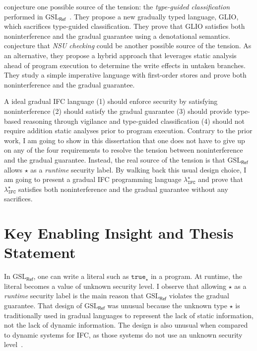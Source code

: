 \documentclass[10pt, letterpaper]{article}
\newcommand{\Surface}{\ensuremath{\lambda_{\mathtt{IFC}}^\star}\xspace}
\newcommand{\GSLRef}{\ensuremath{\mathrm{GSL}_\mathsf{Ref}}\xspace}
\newcommand{\key}[1]{\ensuremath{\mathtt{#1}}}
\newcommand{\unk}{\key{\star}\xspace}
\newcommand{\true}{\key{true}}
\begin{document}
\citet{Amorim:2020aa} conjecture one possible source of the tension: the
\textit{type-guided classification} performed in
\GSLRef~\citep{Toro:2018aa}. They propose a new gradually typed language,
GLIO, which sacrifices type-guided classification. They prove that GLIO
satisfies both noninterference and the gradual guarantee using a denotational
semantics.
%
\citet{bichhawat2021gradual} conjecture that \textit{NSU checking} could be
another possible source of the tension. As an alternative, they propose a hybrid
approach that leverages static analysis ahead of program execution to determine
the write effects in untaken branches. They study a simple imperative language
with first-order stores and prove both noninterference and the gradual
guarantee.

A ideal gradual IFC language (1) should enforce security by
satisfying noninterference (2) should satisfy the gradual guarantee (3) should
provide type-based reasoning through vigilance and type-guided classification
(4) should not require addition static analyses prior to program execution.
Contrary to the prior work, I am going to show in this dissertation that one
does not have to give up on any of the four requirements to resolve the tension
between noninterference and the gradual guarantee. Instead, the real source of
the tension is that \GSLRef allows \unk as a \emph{runtime} security label. By
walking back this usual design choice, I am going to present a gradual
IFC programming language \Surface and prove that \Surface satisfies
both noninterference and the gradual guarantee without any sacrifices.

\section{Key Enabling Insight and Thesis Statement}
\label{sec:insight-and-statement}

In \GSLRef{}, one can write a literal such as $\true_{\unk}$ in a program. At
runtime, the literal becomes a value of unknown security level. I observe that
allowing \unk as a \emph{runtime} security label is the main reason that \GSLRef
violates the gradual guarantee. That design of \GSLRef was unusual because the
unknown type $\unk$ is traditionally used in gradual languages to represent the
lack of static information, not the lack of dynamic information. The design is
also unusual when compared to dynamic systems for IFC, as those systems do not
use an unknown security
level~\citep{Askarov:2009vq,austin2009efficient,Devriese:2010up,stefan2011flexible,Austin:2017uh}.
\end{document}
